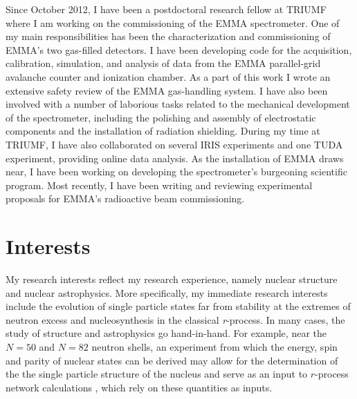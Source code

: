 {Since October 2012,
I have been a postdoctoral research fellow at TRIUMF where I am working
on the commissioning of the EMMA %
spectrometer. %
 One of my main responsibilities has been the characterization and commissioning of EMMA's two gas-filled detectors. %
 I have been developing code for the acquisition, calibration, simulation, and analysis of data from the EMMA parallel-grid avalanche counter and ionization chamber. %
As a part of this work I wrote an extensive safety review of the EMMA gas-handling system. I have also been involved with a number of laborious tasks related to the mechanical development of the spectrometer, including the polishing and assembly of  electrostatic components and the installation of radiation shielding.
		During my time at TRIUMF,  I have also collaborated on several IRIS experiments and one TUDA experiment, providing online data analysis.
		 As the installation of EMMA draws near, I have been working on developing the  spectrometer's burgeoning scientific program.	Most recently, I have been writing and reviewing %
		experimental proposals for EMMA's radioactive beam commissioning.

\section*{Interests}
My research interests reflect my research experience, namely nuclear structure and nuclear astrophysics.  More specifically, my immediate 
research interests include %
 the evolution of single particle states far from stability at the extremes of neutron excess and nucleosynthesis in the classical \textit{r}-process. %
 In many cases, the study of structure
and astrophysics go hand-in-hand. For example, %
near the $N=50$ and $N=82$ neutron shells,  
an experiment from which 
the energy, spin and parity of nuclear states can be derived may allow for the determination of the 
the single particle structure of the nucleus and serve as an input to 
$r$-process%
network calculations 
, which
 rely on these quantities as inputs. %

}
